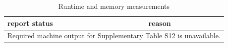 \begin{table}[htbp]
\centering
\caption{Runtime and memory measurements}
\label{tab:s12}
\begin{tabular}{ll}
\hline
report status & reason \\
\hline
\multicolumn{2}{l}{Required machine output for Supplementary Table S12 is unavailable.} \\
\hline
\end{tabular}
\end{table}
